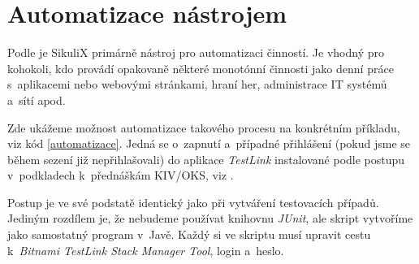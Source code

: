 \chapter{Automatizace nástrojem}
Podle \citep{SikuliX} je SikuliX primárně nástroj pro automatizaci činností. Je vhodný pro kohokoli, kdo provádí opakovaně některé monotónní činnosti jako denní práce s~aplikacemi nebo webovými stránkami, hraní her, administrace IT systémů a~sítí apod.

Zde ukážeme možnost automatizace takového procesu na konkrétním příkladu, viz kód \ref{automatizace}. Jedná se o~zapnutí a~případné přihlášení (pokud jsme se během sezení již nepřihlašovali) do aplikace \emph{TestLink} instalované podle postupu v~podkladech k~přednáškám KIV/OKS, viz \citep{Herout}.

Postup je ve své podstatě identický jako při vytváření testovacích případů. Jediným rozdílem je, že nebudeme používat knihovnu \emph{JUnit}, ale skript vytvoříme jako samostatný program v~Javě. Každý si ve skriptu musí upravit cestu k~\emph{Bitnami TestLink Stack Manager Tool}, login a~heslo.


